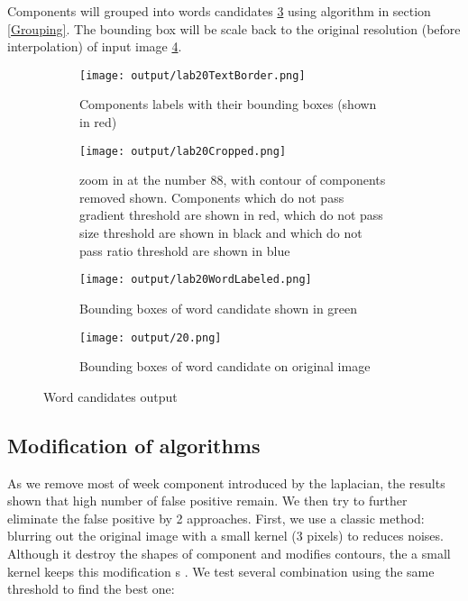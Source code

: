 Components will grouped into words candidates \ref{fig:BoundingBoxOfWordCandidateOnLabel} using algorithm in section \ref{Grouping}. The bounding box will be scale back to the original resolution (before interpolation) of input image \ref{fig:BoundingBoxOfWordCandidate}.


\begin{figure}

	\begin{subfigure}[t]{0.45\textwidth}
	\captionsetup{width=0.85\textwidth} 
		\texttt{[image: output/lab20TextBorder.png]}  \caption{Components labels with their bounding boxes (shown in red)}\label{fig:BoundingBoxOfCharacter} \end{subfigure}	
	\begin{subfigure}[t]{0.45\textwidth} 
	\captionsetup{width=0.80\textwidth} 
	\texttt{[image: output/lab20Cropped.png]}  
	\caption{zoom in at the number 88, with contour of components removed shown. Components which do not pass gradient threshold are shown in red, which do not pass size threshold are shown in black and which do not pass ratio threshold are shown in blue}\label{fig:labeling_contour} \end{subfigure}	
\centering	


	\begin{subfigure}[b]{0.45\textwidth}
	\captionsetup{width=0.85\textwidth} 
		\texttt{[image: output/lab20WordLabeled.png]}  \caption{Bounding boxes of word candidate shown in green}\label{fig:BoundingBoxOfWordCandidateOnLabel} \end{subfigure}
	\begin{subfigure}[b]{0.45\textwidth}
	\captionsetup{width=0.85\textwidth}
		\texttt{[image: output/20.png]}  \caption{Bounding boxes of word candidate on original image}\label{fig:BoundingBoxOfWordCandidate} \end{subfigure}			
\centering	
		
	\caption[Word candidates output] {Word candidates output}
	\label{fig:Wordcandidatesoutput}
\end{figure}
\subsection{Modification of algorithms}
As we remove most of week component introduced by the laplacian, the results shown that high number of false positive remain. We then try to further eliminate the false positive by 2 approaches. First, we use a classic method: blurring out the original image with a small kernel (3 pixels) to reduces noises. Although it destroy the shapes of component and modifies contours, the a small kernel keeps this modification s . We test several combination using the same threshold to find the best one:

